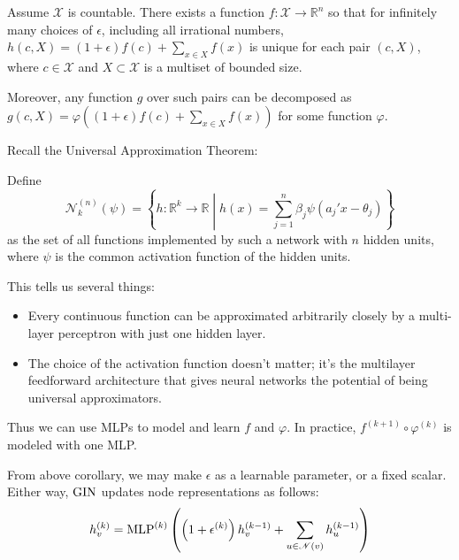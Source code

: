 \begin{corollary}
Assume $\mathcal{X}$ is countable.
There exists a function $f : \mathcal{X} \rightarrow \mathbb{R}^n$ so that for infinitely many choices of $\epsilon$, including all irrational numbers, $h(c, X) = (1 + \epsilon) f(c) + \sum_{x \in X} f(x)$ is unique for each pair $(c, X)$, where $c \in \mathcal{X}$ and $X \subset \mathcal{X}$ is a multiset of bounded size.

\noindent Moreover, any function $g$ over such pairs can be decomposed as $g(c, X) = \varphi \left( (1 + \epsilon) f(c) + \sum_{x \in X} f(x) \right)$ for some function $\varphi$.
\end{corollary}

Recall the Universal Approximation Theorem\cite{Hornik1989}\cite{Hornik1991}:

\begin{theorem}
Define
$$\mathscr{N}_k^{(n)} (\psi) = \left\{ h : \mathbb{R}^k \rightarrow \mathbb{R} \middle| h(x) = \sum_{j = 1}^n \beta_j \psi(a_j' x - \theta_j) \right\}$$
as the set of all functions implemented by such a network with $n$ hidden units, where $\psi$ is the common activation function of the hidden units.

\end{theorem}

This tells us several things:
\begin{itemize}
	\item Every continuous function can be approximated arbitrarily closely by a multi-layer perceptron with just one hidden layer.
	
	\item The choice of the activation function doesn't matter; it's the multilayer feedforward architecture that gives neural networks the potential of being universal approximators.
\end{itemize}

Thus we can use MLPs to model and learn $f$ and $\varphi$.
In practice, $f^{(k + 1)} \circ \varphi^{(k)}$ is modeled with one MLP.

From above corollary, we may make $\epsilon$ as a learnable parameter, or a fixed scalar. Either way, $\operatorname{GIN}$ updates node representations as follows:
	$$h_v^{(k)} = \operatorname{MLP}^{(k)} \left( \left(1 + \epsilon^{(k)} \right) h_v^{(k - 1)} + \sum_{u \in \mathscr{N}(v)} h_u^{(k - 1)} \right)$$

